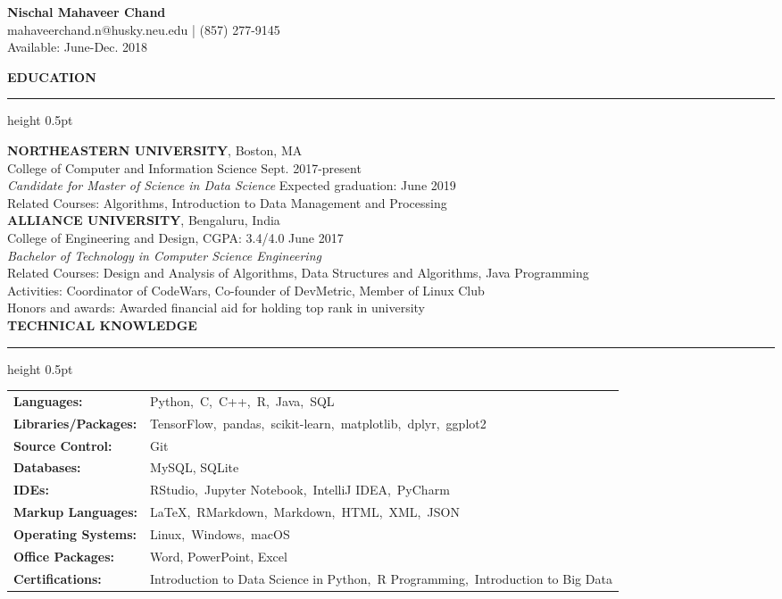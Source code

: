 \documentclass[a4paper]{article}
\newcommand{\myline}{\par
  \kern2pt %
  \hrule height 0.5pt
  \kern2pt %
}
\begin{document}
	\begin{center}
		{\Large \textbf{Nischal Mahaveer Chand}} \\
		mahaveerchand.n@husky.neu.edu | (857) 277-9145 \\
		Available: June-Dec. 2018 \\
	\end{center}
	
	\noindent
	{\large \textbf{EDUCATION}}
	\myline 
	\smallskip
	
	\noindent
	\textbf{NORTHEASTERN UNIVERSITY}, Boston, MA \\
	\indent College of Computer and Information Science \hfill Sept. 2017-present \\
	\indent \textit{Candidate for Master of Science in Data Science} \hfill Expected graduation: June 2019 \\
	\indent Related Courses: Algorithms, Introduction to Data Management and Processing \\
	
	\noindent
	\textbf{ALLIANCE UNIVERSITY}, Bengaluru, India \\
	\indent College of Engineering and Design, CGPA: 3.4/4.0 \hfill June 2017 \\
	\indent \textit{Bachelor of Technology in Computer Science Engineering} \\
	\indent Related Courses: Design and Analysis of Algorithms, Data Structures and Algorithms, Java Programming \\
	\indent Activities: Coordinator of CodeWars, Co-founder of DevMetric, Member of Linux Club \\
	\indent Honors and awards: Awarded financial aid for holding top rank in university\\
	
	\noindent
	{\large \textbf{TECHNICAL KNOWLEDGE}}
	\myline 
	
	\noindent
	\begin{tabular}{ m{3.5cm} l }
		\textbf{Languages: } & Python,\ C,\ C++,\ R,\ Java,\ SQL \\ %
		\textbf{Libraries/Packages: } & TensorFlow,\ pandas,\ scikit-learn,\ matplotlib,\ dplyr,\ ggplot2 \\
		\textbf{Source Control: } & Git	\\
		\textbf{Databases: } & MySQL, SQLite\\
		\textbf{IDEs: } & RStudio,\ Jupyter Notebook,\ IntelliJ IDEA,\ PyCharm\\
		\textbf{Markup Languages: } & LaTeX,\ RMarkdown,\ Markdown,\ HTML,\ XML,\ JSON \\
		\textbf{Operating Systems: } & Linux,\ Windows,\ macOS \\
		\textbf{Office Packages: } & Word, PowerPoint, Excel \\
		\textbf{Certifications: } & Introduction to Data Science in Python,\ R Programming,\ Introduction to Big Data \\
	\end{tabular} \\
\end{document}
